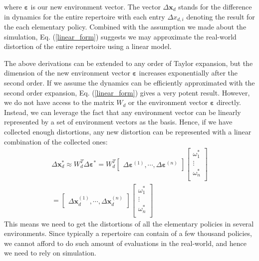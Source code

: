 \documentclass[journal]{IEEEtran}
\begin{document}
where $\bm{\varepsilon}$ is our new environment vector. 
The vector $\Delta \bm{x}_d$ stands for the difference in dynamics for the entire repertoire with each entry $\Delta x_{d, i}$ denoting the result for the each elementary policy.
Combined with the assumption we made about the simulation, Eq. (\ref{linear_form}) suggests we may approximate the real-world distortion of the entire repertoire using a linear model. 


The above derivations can be extended to any order of Taylor expansion, but the dimension of the new environment vector $\bm{\varepsilon}$ increases exponentially after the second order.
If we assume the dynamics can be efficiently approximated with the second order expansion, Eq. (\ref{linear_form}) gives a very potent result.
However, we do not have access to the matrix $W_d$ or the environment vector $\bm{\varepsilon}$ directly. 
Instead, we can leverage the fact that any environment vector can be linearly represented by a set of environment vectors as the basis.
Hence, if we have collected enough distortions, any new distortion can be  represented with a linear combination of the collected ones:
\begin{equation}
\begin{gathered}
\Delta \bm{x}_d^* \approx
W_{d}^T \Delta \bm{\varepsilon}^* = 
W_{d}^T
\begin{bmatrix}
\Delta \bm{\varepsilon}^{(1)}, \cdots, \Delta \bm{\varepsilon}^{(n)}
\end{bmatrix}
\begin{bmatrix}
\omega_1^* \\
\vdots \\
\omega_n^* \\
\end{bmatrix}
\\ =
\begin{bmatrix}
\Delta \bm{x}_d^{(1)}, \cdots, \Delta \bm{x}_d^{(n)}
\end{bmatrix}
\begin{bmatrix}
\omega_1^* \\
\vdots \\
\omega_n^* \\
\end{bmatrix}
\end{gathered}
\label{linear_combination}
\end{equation}
This means we need to get the distortions of all the elementary policies in several environments.
Since typically a repertoire can contain of a few thousand policies,
we cannot afford to do such amount of evaluations in the real-world, and hence we need to rely on simulation.
\end{document}
